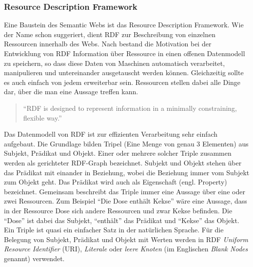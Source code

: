 \subsubsection{Resource Description Framework} %
\label{ssub:resource_description_framework}

Eine Baustein des Semantic Webs ist das Resource Description Framework. Wie der Name schon suggeriert, dient RDF zur Beschreibung von einzelnen Ressourcen innerhalb des Webs. Nach \cite{Klyne2004,Manola2004} bestand die Motivation bei der Entwicklung von RDF Information über Ressource in einen offenen Datenmodell zu speichern, so dass diese Daten von Maschinen automatisch verarbeitet, manipulieren und untereinander ausgetauscht werden können. Gleichzeitig sollte es auch einfach von jedem erweiterbar sein. Ressourcen stellen dabei alle Dinge dar, über die man eine Aussage treffen kann. 

\begin{quote}
\enquote{RDF is designed to represent information in a minimally constraining, flexible way.}\cite[Abschnitt 2.1 \enquote{Motivation}]{Klyne2004}
\end{quote}

Das Datenmodell von RDF ist zur effizienten Verarbeitung sehr einfach aufgebaut. Die Grundlage bilden Tripel (Eine Menge von genau 3 Elementen) aus Subjekt, Prädikat und Objekt. Einer oder mehrere solcher Triple zusammen werden als gerichteter RDF-Graph bezeichnet. Subjekt und Objekt stehen über das Prädikat mit einander in Beziehung, wobei die Beziehung immer vom Subjekt zum Objekt geht. Das Prädikat wird auch als Eigenschaft (engl. Property) bezeichnet. Gemeinsam beschreibt das Triple immer eine Aussage über eine oder zwei Ressourcen. Zum Beispiel \enquote{Die Dose enthält Kekse} wäre eine Aussage, dass in der Ressource Dose sich andere Ressourcen und zwar Kekse befinden. Die \enquote{Dose} ist dabei das Subjekt, \enquote{enthält} das Prädikat und \enquote{Kekse} das Objekt. Ein Triple ist quasi ein einfacher Satz in der natürlichen Sprache. Für die Belegung von Subjekt, Prädikat und Objekt mit Werten werden in RDF \emph{Uniform Resource Identifier} (URI), \emph{Literale} oder \emph{leere Knoten} (im Englischen \emph{Blank Nodes} genannt) verwendet. 

